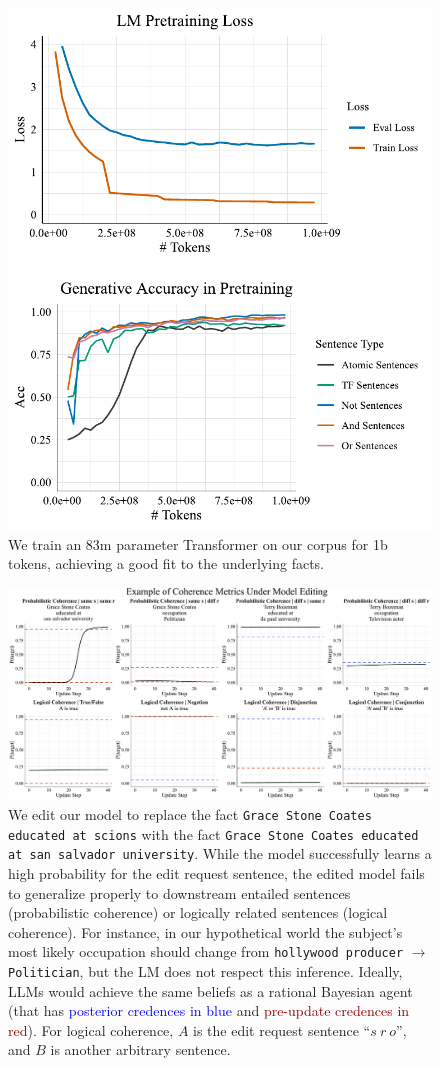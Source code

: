 \documentclass[11pt,a4paper]{article}
\begin{document}
\begin{figure}[!t]
   \centering
   \includegraphics[width=.49\textwidth]{figs/training-curves.pdf}
   \vspace{-19pt}
   \caption{We train an 83m parameter Transformer on our corpus for 1b tokens, achieving a good fit to the underlying facts.}
   \vspace{-1pt}
   \label{fig:pretraining_plot}
\end{figure}


\begin{figure}[!t]
   \centering
   \includegraphics[width=.99\textwidth]{figs/editing-example.pdf}
   \vspace{-2pt}
   \caption{We edit our model to replace the fact \texttt{Grace Stone Coates educated at scions} with the fact \texttt{Grace Stone Coates educated at san salvador university}. While the model successfully learns a high probability for the edit request sentence, the edited model fails to generalize properly to downstream entailed sentences (probabilistic coherence) or logically related sentences (logical coherence). 
   For instance, in our hypothetical world the subject's most likely occupation should change from \texttt{hollywood producer} $\rightarrow$ \texttt{Politician}, but the LM does not respect this inference.
   Ideally, LLMs would achieve the same beliefs as a rational Bayesian agent (that has \textcolor{blue}{posterior credences in blue} and \textcolor{darkred}{pre-update credences in red}). 
   For logical coherence, $A$ is the edit request sentence ``$s \ r \ o$'', and $B$ is another arbitrary sentence.}
   \vspace{-1pt}
   \label{fig:editing_example}
\end{figure}
\end{document}

